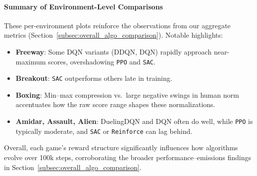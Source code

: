 \paragraph{Summary of Environment-Level Comparisons}
These per-environment plots reinforce the observations from our aggregate metrics 
(Section~\ref{subsec:overall_algo_comparison}). 
Notable highlights:
\begin{itemize}
	\item \textbf{Freeway}: Some DQN variants (DDQN, DQN) rapidly approach near-maximum 
	scores, overshadowing \texttt{PPO} and \texttt{SAC}.
	\item \textbf{Breakout}: \texttt{SAC} outperforms others late in training.
	\item \textbf{Boxing}: Min--max compression vs.\ large negative swings in human norm 
	accentuates how the raw score range shapes these normalizations.
	\item \textbf{Amidar, Assault, Alien}: DuelingDQN and DQN often do well, 
	while \texttt{PPO} is typically moderate, and \texttt{SAC} or \texttt{Reinforce} 
	can lag behind.
\end{itemize}
Overall, each game’s reward structure significantly influences how algorithms evolve 
over 100k steps, corroborating the broader performance–emissions findings in 
Section~\ref{subsec:overall_algo_comparison}.


